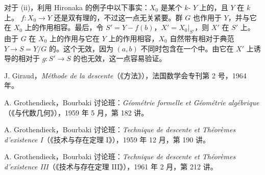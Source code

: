 对于 (ii)，利用 Hironaka 的例子中以下事实：$X_0$ 是某个 $k$- $Y$ 上的，且 $Y$ 在 $k$ 上。 $f:X_0\to Y$ 还是双有理的，不过这一点无关紧要。群 $G$ 也作用于 $Y$，并与它在 $X_0$ 上的作用相容。最后，令 $S'=Y-f(b)$，$X'=X_0|_{S'}$，则 $X'$ 在 $S'$ 上。由于 $G$ 在 $X_0$ 上的作用与它在 $Y$ 上的作用相容，$X_0$ 自然带有相对于典范 $Y\to S=Y/G$ 的。这个无效，因为 $(a,b)$ 不同时包含在一个中。由它在 $X'$ 上诱导的相对于 $g:S'\to S$ 的也无效，这一点容易验证。

\begin{description}[leftmargin=2.8em,labelsep=.5em]
\item[{[D]}] J. Giraud，\textit{Méthode de la descente}（《方法》），法国数学会专刊第 2 号，1964 年。
\item[{[1]}] A. Grothendieck，Bourbaki 讨论班：\textit{Géométrie formelle et Géométrie algébrique}（《与代数几何》），1959 年 5 月，第 182 讲。
\item[{[2]}] A. Grothendieck，Bourbaki 讨论班：\textit{Technique de descente et Théorèmes d'existence I}（《技术与存在定理 I》），1959 年 12 月，第 190 讲。
\item[{[3]}] A. Grothendieck，Bourbaki 讨论班：\textit{Technique de descente et Théorèmes d'existence III}（《技术与存在定理 III》），1961 年 2 月，第 212 讲。
\end{description}
